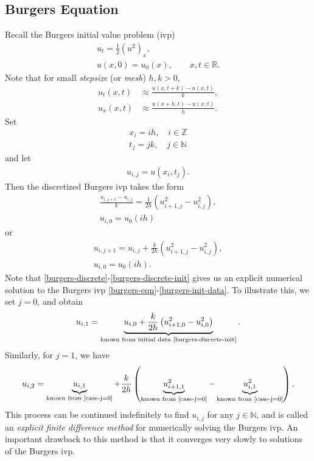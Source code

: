 \documentclass[12pt]{article}
\newcommand{\rr}{\mathbb{R}}
\theoremstyle{plain}
\theoremstyle{definition}
\theoremstyle{remark}
\numberwithin{equation}{section}  %
\begin{document}
\subsection{Burgers Equation}
Recall the Burgers initial value problem (ivp)
\begin{gather}
\label{burgers-eqn}
u_{t} = \frac{1}{2}(u^{2})_{x},
\\
\label{burgers-init-data}
u(x, 0) = u_{0}(x), \qquad x, t \in \rr.
\end{gather}
Note that for small \emph{stepsize} (or \emph{mesh}) $h, k >0$,
\begin{equation*}
\begin{split}
u_{t}(x,t) &\approx \frac{u(x, t+k) - u(x, t)}{k},
\\
u_{x}(x, t) & \approx \frac{u(x+h, t) - u(x, t)}{h}.
\end{split}
\end{equation*}
Set
\begin{gather*}
x_i = ih, \quad i \in \mathbb{Z}
\\
t_{j}=jk, \quad j \in \mathbb{N}
\end{gather*}
and let
\begin{gather*}
u_{i,j} = u(x_{i}, t_{j}).
\end{gather*}
Then the discretized Burgers ivp takes the form
\begin{gather*}
\frac{u_{i, j+1}- u_{i,j}}{k}=\frac{1}{2h}\left( u_{i+1,j}^{2} -
u_{i,j}^{2} \right),
\\
u_{i,0} = u_{0}(ih)
\end{gather*}
or
\begin{gather}
\label{burgers-discrete}
u_{i, j+1}=u_{i,j} + \frac{k}{2h}\left( u_{i+1,j}^{2} -
u_{i,j}^{2} \right),
\\
\label{burgers-discrete-init}
u_{i,0} = u_{0}(ih).
\end{gather}
Note that \eqref{burgers-discrete}-\eqref{burgers-discrete-init} gives us an
explicit numerical solution to the Burgers ivp
\eqref{burgers-eqn}-\eqref{burgers-init-data}. To illustrate this, we set
$j=0$, and obtain
\begin{equation}
\label{case-j=0}
\begin{split}
u_{i,1} = \underbrace{u_{i,0} + \frac{k}{2h}\left( u_{i+1,0}^{2} -
u_{i,0}^{2} \right)}_{\text{known from initial data
\eqref{burgers-discrete-init}}}.
\end{split}
\end{equation}
Similarly, for $j=1$, we have
\begin{equation*}
\begin{split}
u_{i,2} = \underbrace{u_{i,1}}_{\text{known from
\eqref{case-j=0}}} + \frac{k}{2h}\left(
\underbrace{u_{i+1,1}^{2}}_{\text{known from \eqref{case-j=0}}} -
\underbrace{u_{i,1}^{2}}_{\text{known from
\eqref{case-j=0}}} \right).
\end{split}
\end{equation*} 
This process can be
continued indefinitely to find $u_{i, j}$ for any $j \in \mathbb{N}$, and is
called an \emph{explicit finite difference method} for numerically solving the
Burgers ivp. An important drawback to this method is that it converges very
slowly to solutions of the Burgers ivp.
\end{document}
